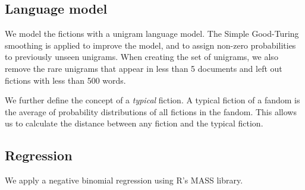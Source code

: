 \documentclass[a4paper]{article}
\begin{document}
\subsection{Language model}
We model the fictions with a unigram language model. The Simple Good-Turing smoothing\cite{gales1995good} is applied to improve the model, and to assign non-zero probabilities to previously unseen unigrams. When creating the set of unigrams, we also remove the rare unigrams that appear in less than 5 documents and left out fictions with less than 500 words.


We further define the concept of a \emph{typical} fiction. A typical fiction of a fandom is the average of probability distributions of all fictions in the fandom. This allows us to calculate the distance between any fiction and the typical fiction. 

\subsection{Regression}
We apply a negative binomial regression using R's MASS library. 











    
\end{document}
